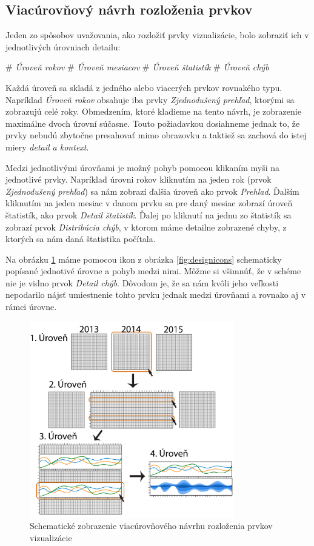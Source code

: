 \subsection{Viacúrovňový návrh rozloženia prvkov}
Jeden zo spôsobov uvažovania, ako rozložiť prvky vizualizácie, bolo zobraziť ich v jednotlivých úrovniach detailu: 
\begin{easylist}
	# \textit{Úroveň rokov}
	# \textit{Úroveň mesiacov}
	# \textit{Úroveň štatistík}
	# \textit{Úroveň chýb} 
\end{easylist}
Každá úroveň sa skladá z jedného alebo viacerých prvkov rovnakého typu. Napríklad \textit{Úroveň rokov} obsahuje iba prvky \textit{Zjednodušený prehľad}, ktorými sa zobrazujú celé roky. Obmedzením, ktoré kladieme na tento návrh, je zobrazenie maximálne dvoch úrovní súčasne. Touto požiadavkou dosiahneme jednak to, že prvky nebudú zbytočne presahovať mimo obrazovku a taktiež sa zachová do istej miery \textit{detail a kontext}. 

Medzi jednotlivými úrovňami je možný pohyb pomocou klikaním myši na jednotlivé prvky. Napríklad úrovni rokov kliknutím na jeden rok (prvok \textit{Zjednodušený prehľad}) sa nám zobrazí ďalšia úroveň ako prvok \textit{Prehľad}. Ďalším kliknutím na jeden mesiac v danom prvku sa pre daný mesiac zobrazí úroveň štatistík, ako prvok \textit{Detail štatistík}. Ďalej po kliknutí na jednu zo štatistík sa zobrazí prvok \textit{Distribúcia chýb}, v ktorom máme detailne zobrazené chyby, z ktorých sa nám daná štatistika počítala.

Na obrázku \ref{fig:multilevellayout} máme pomocou ikon z obrázka \ref{fig:designicons} schematicky popísané jednotivé úrovne a pohyb medzi nimi. Môžme si všimnúť, že v schéme nie je vidno prvok \textit{Detail chýb}. Dôvodom je, že sa nám kvôli jeho veľkosti nepodarilo nájsť umiestnenie tohto prvku jednak medzi úrovňami a rovnako aj v rámci úrovne.

\begin{figure}
	\centering
	\includegraphics[width = 3.5in]{multilevellayout}
	\caption{Schematické zobrazenie viacúrovňového návrhu rozloženia prvkov vizualizácie}
	\label{fig:multilevellayout}
\end{figure}


